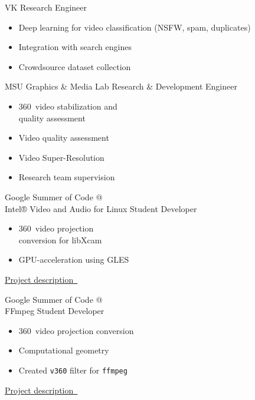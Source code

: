 \documentclass{tccv}
\newcommand{\sphere}{360\textdegree~}
\begin{document}
\begin{eventlist}

     {VK}
     {Research Engineer}
\begin{itemize}
     \item Deep learning for video classification (NSFW, spam, duplicates)
     \item Integration with search engines
     \item Crowdsource dataset collection
\end{itemize}

     {MSU Graphics \& Media Lab}
     {Research \& Development Engineer}
\vspace{-10pt} %
\begin{itemize}
     \item \sphere video stabilization and \\quality assessment
     \item Video quality assessment
     \item Video Super-Resolution
     \item Research team supervision
\end{itemize}

     {Google Summer of Code @ \\ Intel® Video and Audio for Linux}
     {Student Developer}
\begin{itemize}
     \item \sphere video projection \\ conversion for libXcam
     \item GPU-acceleration using GLES 
\end{itemize}
\href{https://unishift.github.io/project/2021-08-20-gsoc-libxcam}{Project description~\faExternalLink*}

     {Google Summer of Code @ \\ FFmpeg}
     {Student Developer}
\begin{itemize}
     \item \sphere video projection conversion
     \item Computational geometry
     \item Created \texttt{v360} filter for \texttt{ffmpeg}
\end{itemize}
\href{https://unishift.github.io/project/2019-08-26-gsoc-ffmpeg}{Project description~\faExternalLink*}

\end{eventlist}
\end{document}
